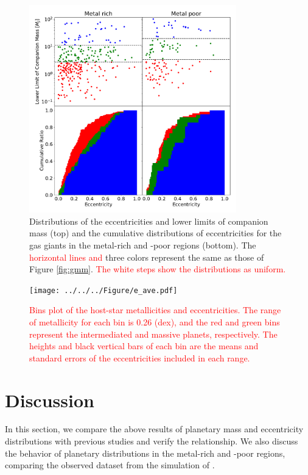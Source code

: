 \documentclass[twocolumn, dvipdfmx]{aastex62}
\def\red<#1>{\textcolor{red}{#1}}
\begin{document}
\begin{CJK*}{UTF8}{min}
\begin{figure}[t]
\begin{center}
\includegraphics[width=9cm]{../../../Figure/e_Mp_merge.pdf}
\caption{Distributions of the eccentricities and lower limits of companion mass (top) and the cumulative distributions of eccentricities for the gas giants in the metal-rich and -poor regions (bottom). The \red<horizontal lines and> three colors represent the same as those of Figure \ref{fig:gmm}. \red<The white steps show the distributions as uniform.> \label{fig:e_Mp}}
\end{center}
\end{figure}

\begin{figure}[t]
\begin{center}
\texttt{[image: ../../../Figure/e\_ave.pdf]}
\caption{\red<Bins plot of the host-star metallicities and eccentricities. The range of metallicity for each bin is 0.26 (dex), and the red and green bins represent the intermediated and massive planets, respectively. The heights and black vertical bars of each bin are the means and standard errors of the eccentricities included in each range.> \label{fig:e_ave}}
\end{center}
\end{figure}


\section{Discussion}

In this section, we compare the above results of planetary mass and eccentricity distributions with previous studies and verify the relationship. We also discuss the behavior of planetary distributions in the metal-rich and -poor regions, comparing the observed dataset from the simulation of \cite{2012A&A...541A..97M}.



\end{CJK*}
\end{document}
